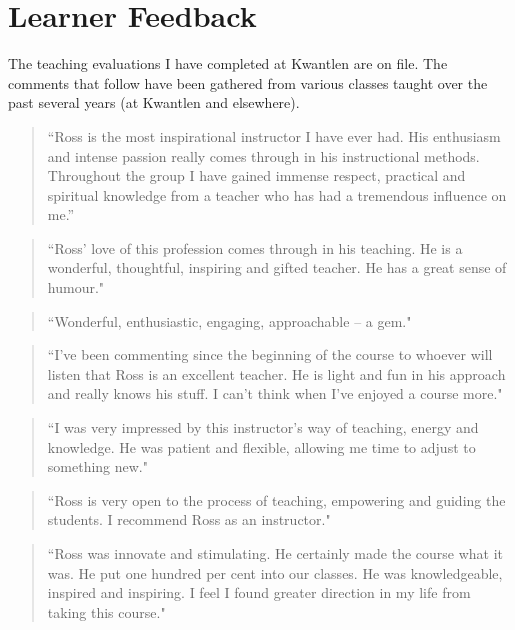 \documentclass[10pt,DIV09,letterpaper,oneside,headsepline]{scrreprt}
\begin{document}
\chapter{Learner Feedback}

The teaching evaluations I have completed at Kwantlen are on file. The comments that follow have been gathered from various classes taught over the past several years (at Kwantlen and elsewhere).

\begin{quote}``Ross is the most inspirational instructor I have ever had. His enthusiasm and intense passion really comes through in his instructional methods. Throughout the group I have gained immense respect, practical and spiritual knowledge from a teacher who has had a tremendous influence on me.'' \end{quote}


\begin{quote} ``Ross' love of this profession comes through in his teaching. He is a wonderful, thoughtful, inspiring and gifted teacher. He has a great sense of humour." \end{quote}

\begin{quote} ``Wonderful, enthusiastic, engaging, approachable -- a gem." \end{quote}

\begin{quote} ``I've been commenting since the beginning of the course to whoever will listen that Ross is an excellent teacher. He is light and fun in his approach and really knows his stuff. I can't think when I've enjoyed a course more." \end{quote}

\begin{quote} ``I was very impressed by this instructor's way of teaching, energy and knowledge. He was patient and flexible, allowing me time to adjust to something new." \end{quote}

\begin{quote} ``Ross is very open to the process of teaching, empowering and guiding the students. I recommend Ross as an instructor." \end{quote}

\begin{quote} ``Ross was innovate and stimulating. He certainly made the course what it was. He put one hundred per cent into our classes. He was knowledgeable, inspired and inspiring. I feel I found greater direction in my life from taking this course." \end{quote}
\end{document}

